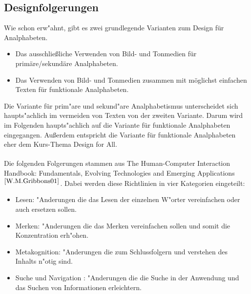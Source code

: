 \subsection{ Designfolgerungen}\label{sec:designClue}
Wie schon erw"ahnt, gibt es zwei grundlegende Varianten zum Design für Analphabeten.
\begin{itemize}
\item Das ausschließliche Verwenden von Bild- und Tonmedien für primäre/sekundäre Analphabeten.
\item Das Verwenden von Bild- und Tonmedien zusammen mit möglichst einfachen Texten für funktionale Analphabeten.
\end{itemize}
Die Variante für prim"are und sekund"are Analphabetismus unterscheidet sich haupts"achlich im vermeiden von Texten von der zweiten Variante. Darum wird im Folgenden haupts"achlich auf die Variante für funktionale Analphabeten eingegangen.
Außerdem entspricht die Variante für funktionale Analphabeten eher dem Kurs-Thema \glqq Design for All\grqq .\\\\

Die folgenden Folgerungen stammen aus \glqq The Human-Computer Interaction Handbook: Fundamentals, Evolving Technologies and Emerging Applications \grqq $^{\ref{W.M.Gribbons01}}$. Dabei werden diese Richtlinien in vier Kategorien eingeteilt:\\

\begin{itemize}
\item Lesen:              "Anderungen die das Lesen der einzelnen W"orter vereinfachen oder auch ersetzen sollen.
\item Merken:            "Anderungen die das Merken vereinfachen sollen und somit die Konzentration erh"ohen.
\item Metakognition: "Anderungen die zum Schlussfolgern und verstehen des Inhalts n"otig sind.
\item Suche und Navigation : "Anderungen die die Suche in der Anwendung und das Suchen von Informationen erleichtern.
\end{itemize}


